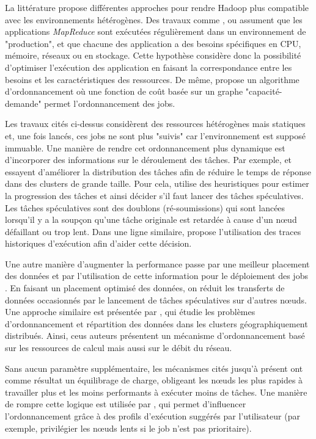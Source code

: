 La littérature propose différentes approches pour rendre Hadoop plus compatible avec les environnements hétérogènes. Des travaux comme \cite{Kumar2012}, \cite{Tian2009} ou \cite{Rasooli2012} assument que les applications \textit{MapReduce} sont exécutées régulièrement dans un environnement de "production", et que chacune des application a des besoins spécifiques en CPU, mémoire, réseaux ou en stockage. Cette hypothèse considère donc la possibilité d'optimiser l'exécution des application en faisant la correspondance entre les besoins et les caractéristiques des ressources. De même, \cite{Isard2009} propose un algorithme d'ordonnancement où une fonction de coût basée sur un graphe "capacité-demande" permet l'ordonnancement des jobs.

Les travaux cités ci-dessus considèrent des ressources hétérogènes mais statiques et, une fois lancés, ces jobs ne sont plus "suivis" car l'environnement est supposé immuable. Une manière de rendre cet ordonnancement plus dynamique est d'incorporer des informations sur le déroulement des tâches. Par exemple, \cite{Zaharia2008} et \cite{Chen} essayent d'améliorer la distribution des tâches afin de réduire le temps de réponse dans des clusters de grande taille. Pour cela, \cite{Zaharia2008} utilise des heuristiques pour estimer la progression des tâches et ainsi décider s'il faut lancer des tâches spéculatives. Les tâches spéculatives sont des doublons (ré-soumissions) qui sont lancées lorsqu'il y a la soupçon qu'une tâche originale est retardée à cause d'un n{\oe}ud défaillant ou trop lent. Dans une ligne similaire, \cite{Chen} propose l'utilisation des traces historiques d'exécution afin d'aider cette décision. 


Une autre manière d'augmenter la performance passe par une meilleur placement des données et par l'utilisation de cette information pour le déploiement des jobs \cite{Xie2010}. En faisant un placement optimisé des données, on réduit les transferts de données occasionnés par le lancement de tâches spéculatives sur d'autres n{\oe}uds. Une approche similaire est présentée par \cite{Cavallo2015}, qui étudie les problèmes d'ordonnancement et répartition des données dans les clusters géographiquement distribués. Ainsi, ceus auteurs présentent un mécanisme d'ordonnancement basé sur les ressources de calcul mais aussi sur le débit du réseau.  

Sans aucun paramètre supplémentaire, les mécanismes cités jusqu'à présent ont comme résultat un équilibrage de charge, obligeant les n{\oe}uds les plus rapides à travailler plus et les moins performants à exécuter moins de tâches. Une manière de rompre cette logique est utilisée par \cite{Sandholm2010},  qui permet d'influencer l'ordonnancement grâce à des profils d'exécution suggérés par l'utilisateur (par exemple, privilégier les n{\oe}uds lents si le job n'est pas prioritaire).  

